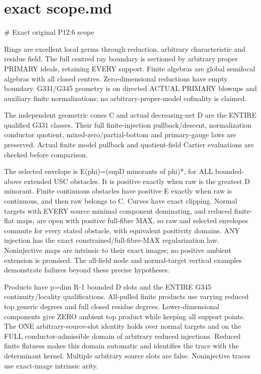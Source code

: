\documentclass[11pt]{article}
\begin{document}
\section{exact scope.md}
\begin{ReviewBody}
# Exact original P12.6 scope

Rings are excellent local germs through reduction, arbitrary characteristic and residue field. The full centred ray boundary is sectioned by arbitrary proper PRIMARY ideals, retaining EVERY support. Finite algebras are global semilocal algebras with all closed centres. Zero-dimensional reductions have empty boundary. G331/G345 geometry is on directed ACTUAL PRIMARY blowups and auxiliary finite normalizations; no arbitrary-proper-model cofinality is claimed.

The independent geometric cones C and actual decreasing-net D are the ENTIRE qualified G331 classes. Their full finite-injection pullback/descent, normalization conductor quotient, mixed-zero/partial-bottom and primary-gauge laws are preserved. Actual finite model pullback and quotient-field Cartier evaluations are checked before comparison.

The selected envelope is E(phi)=(sup{D minorants of phi})*, for ALL bounded-above extended USC obstacles. It is positive exactly when raw is the greatest D minorant. Finite continuous obstacles have positive E exactly when raw is continuous, and then raw belongs to C. Curves have exact clipping. Normal targets with EVERY source minimal component dominating, and reduced finite-flat maps, are open with positive full-fibre MAX, so raw and selected envelopes commute for every stated obstacle, with equivalent positivity domains. ANY injection has the exact constrained/full-fibre-MAX regularization law. Noninjective maps are intrinsic to their exact images; no positive ambient extension is promised. The all-field node and normal-target vertical examples demonstrate failures beyond these precise hypotheses.

Products have p=dim R-1 bounded D slots and the ENTIRE G345 continuity/locality qualifications. All-pulled finite products use varying reduced top generic degrees and full closed residue degrees. Lower-dimensional components give ZERO ambient top product while keeping all support points. The ONE arbitrary-source-slot identity holds over normal targets and on the FULL conductor-admissible domain of arbitrary reduced injections. Reduced finite flatness makes this domain automatic and identifies the trace with the determinant kernel. Multiple arbitrary source slots are false. Noninjective traces use exact-image intrinsic arity.


\end{ReviewBody}
\end{document}
